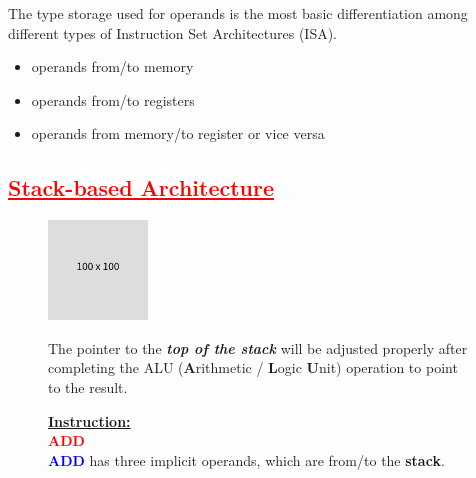 \documentclass[
  14pt,
  a4paper,
  DIV=11,
  numbers=noendperiod,
  headinclude=true,
  footinclude=true]{scrreprt}
\providecommand{\tightlist}{%
  \setlength{\itemsep}{0pt}\setlength{\parskip}{0pt}}\usepackage{longtable,booktabs,array}
\begin{document}
\begin{tcolorbox}[colback=boxbodycol, colframe=boxbodycol]

The type storage used for operands is the most basic differentiation
among different types of Instruction Set Architectures (ISA).

\begin{itemize}
\tightlist
\item
  operands from/to memory
\item
  operands from/to registers
\item
  operands from memory/to register or vice versa
\end{itemize}

\end{tcolorbox}

\subsection{\texorpdfstring{\textcolor{red}{\underline{Stack-based Architecture}}}{}}\label{section}

\begin{figure}[H]

\begin{minipage}{0.40\linewidth}

\includegraphics{index_files/mediabag/FiKGhYhhIWJYiBgWIoaF.png}\end{minipage}%
%
\begin{minipage}{0.60\linewidth}

\begin{tcolorbox}[colback=boxbodycol, colframe=boxbodycol]
The pointer to the \textbf{\emph{top of the stack}} will be adjusted
properly after completing the ALU (\textbf{A}rithmetic / \textbf{L}ogic
\textbf{U}nit) operation to point to the result.

\end{tcolorbox}

\begin{tcolorbox}[colback=boxbodycol, colframe=boxbodycol]
\textbf{\underline{Instruction:}}\\
\textcolor{red}{\textbf{ADD}}\\
\textcolor{blue}{\textbf{ADD}} has three implicit operands, which are
from/to the \textbf{stack}.

\end{tcolorbox}

\end{minipage}%

\end{figure}%
\end{document}
